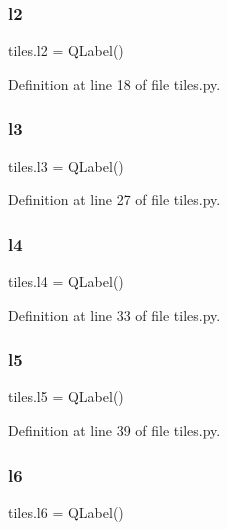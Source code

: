 \subsubsection{\texorpdfstring{l2}{l2}}
{\footnotesize\ttfamily tiles.\+l2 = Q\+Label()}



Definition at line 18 of file tiles.\+py.

\mbox{\label{namespacetiles_a254501b081f1a293af3dd217c9be3ffb}} 
\subsubsection{\texorpdfstring{l3}{l3}}
{\footnotesize\ttfamily tiles.\+l3 = Q\+Label()}



Definition at line 27 of file tiles.\+py.

\mbox{\label{namespacetiles_ad8a0fe4d4d12e46a051f04859d4b1cf5}} 
\subsubsection{\texorpdfstring{l4}{l4}}
{\footnotesize\ttfamily tiles.\+l4 = Q\+Label()}



Definition at line 33 of file tiles.\+py.

\mbox{\label{namespacetiles_a246947d32c280cee85469a46d41f2979}} 
\subsubsection{\texorpdfstring{l5}{l5}}
{\footnotesize\ttfamily tiles.\+l5 = Q\+Label()}



Definition at line 39 of file tiles.\+py.

\mbox{\label{namespacetiles_a0819f43794a70ef7332df1215572b6ce}} 
\subsubsection{\texorpdfstring{l6}{l6}}
{\footnotesize\ttfamily tiles.\+l6 = Q\+Label()}



